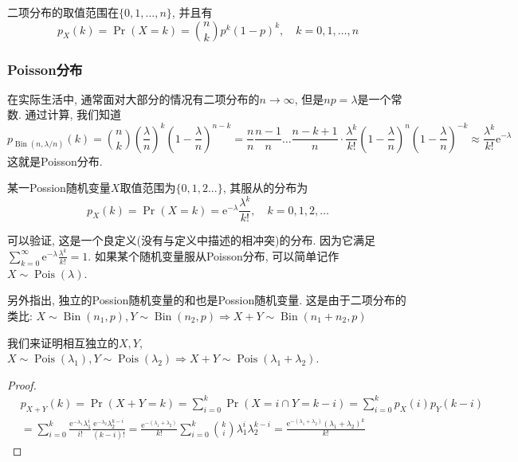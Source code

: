 \documentclass{ctexart}
\begin{document}
二项分布的取值范围在$\{ 0,1, ..., n \}$, 并且有
$$
p_X(k)=\operatorname{Pr}(X=k)=\binom{n}{k} p^k(1-p)^k, \quad k=0,1, \ldots, n
$$





\subsubsection{Poisson分布} 在实际生活中, 通常面对大部分的情况有二项分布的$n \to \infty$, 但是$np=\lambda$是一个常数. 通过计算, 我们知道
$$
p_{\operatorname{Bin}(n, \lambda / n)}(k)=\binom{n}{k}\left(\frac{\lambda}{n}\right)^k\left(1-\frac{\lambda}{n}\right)^{n-k}=\frac{n}{n} \frac{n-1}{n} \ldots \frac{n-k+1}{n} \cdot \frac{\lambda^k}{k!}\left(1-\frac{\lambda}{n}\right)^n\left(1-\frac{\lambda}{n}\right)^{-k} \approx \frac{\lambda^k}{k!} \mathrm{e}^{-\lambda}
$$
这就是Poisson分布. 

\begin{definition}[Possion分布]
    某一Possion随机变量$X$取值范围为$\{ 0,1,2 ... \}$, 其服从的分布为
    $$
p_X(k)=\operatorname{Pr}(X=k)=\mathrm{e}^{-\lambda} \frac{\lambda^k}{k!}, \quad k=0,1,2, \ldots
$$
\end{definition}

可以验证, 这是一个良定义(没有与定义中描述的相冲突)的分布. 因为它满足$\sum_{k=0}^{\infty} \mathrm{e}^{-\lambda} \frac{\lambda^k}{k!}=1$. 如果某个随机变量服从Poisson分布, 可以简单记作$X \sim \operatorname{Pois}(\lambda)$. 


另外指出, 独立的Possion随机变量的和也是Possion随机变量. 这是由于二项分布的类比: $X \sim \operatorname{Bin}\left(n_1, p\right), Y \sim \operatorname{Bin}\left(n_2, p\right) \Longrightarrow X+Y \sim \operatorname{Bin}\left(n_1+n_2, p\right)$

我们来证明相互独立的$X, Y$, $X \sim \operatorname{Pois}\left(\lambda_1\right), Y \sim \operatorname{Pois}\left(\lambda_2\right) \Longrightarrow X+Y \sim \operatorname{Pois}\left(\lambda_1+\lambda_2\right)$.

\begin{proof}
    $$
\begin{aligned}
& p_{X+Y}(k)=\operatorname{Pr}(X+Y=k)=\sum_{i=0}^k \operatorname{Pr}(X=i \cap Y=k-i)=\sum_{i=0}^k p_X(i) p_Y(k-i) \\
& =\sum_{i=0}^k \frac{\mathrm{e}^{-\lambda_1} \lambda_1^i}{i!} \frac{\mathrm{e}^{-\lambda_2} \lambda_2^{k-i}}{(k-i)!}=\frac{\mathrm{e}^{-\left(\lambda_1+\lambda_2\right)}}{k!} \sum_{i=0}^k\binom{k}{i} \lambda_1^i \lambda_2^{k-i}=\frac{\mathrm{e}^{-\left(\lambda_1+\lambda_2\right)}\left(\lambda_1+\lambda_2\right)^k}{k!}
\end{aligned}
$$
\end{proof}
\end{document}
